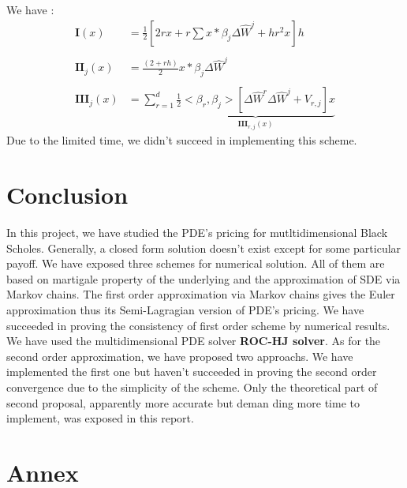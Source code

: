 \documentclass[a4paper,10pt]{article}
\begin{document}
We have : 
\begin{equation*}
\begin{split}
\textbf{I}(x)   %
                & = \frac{1}{2} \left[ 2rx  + r \sum x*\beta_j \Delta\hat{W}^j  + hr^2x \right] h \\ \\
\textbf{II}_j(x)  & = \frac{(2+rh)}{2} x*\beta_j \Delta \hat{W}^j \\ \\
\textbf{III}_j(x) & =  \sum^d_{r=1} \underbrace{\frac{1}{2}<\beta_r,\beta_j>  \left[ \Delta \hat{W}^r \Delta \hat{W}^j + V_{r,j} \right] x}_{\textbf{III}_{r,j}(x)}
\end{split}
\end{equation*}
Due to the limited time, we didn't succeed in implementing this scheme.  

\section{Conclusion}
In this project, we have studied the PDE's pricing for mutltidimensional Black Scholes. Generally, a closed form solution doesn't exist  except for some particular payoff. We have exposed three schemes for numerical solution. All of them are based on martigale property of the underlying and the approximation of SDE via Markov chains. The first order approximation via Markov chains gives the Euler approximation thus its Semi-Lagragian version of PDE's pricing. We have succeeded in proving the consistency of first order scheme by numerical results. We have used the multidimensional PDE solver \textbf{ROC-HJ solver}\cite{BokanowskiLib}. As for the second order approximation, we have proposed two approachs. We have implemented the first one but haven't succeeded in proving the second order convergence due to the simplicity of the scheme. Only the theoretical part of second proposal, apparently more accurate but deman ding more time to implement, was exposed in this report.  

\section{Annex}
\end{document}
